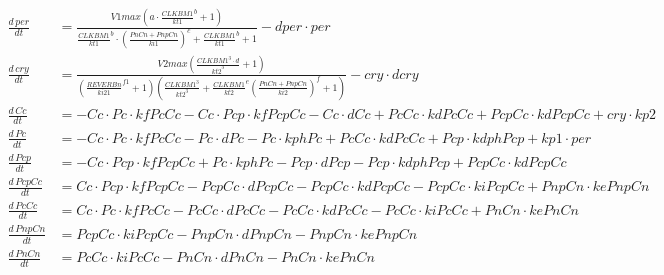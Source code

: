 \begin{model}[p]
\begin{align*}
  \frac{d\,\mathit{per}}{dt} &= \frac{\mathit{V1max} \left(\mathit{a} \cdot {\frac{\mathit{CLKBM1}}{\mathit{kt1}}}^{\mathit{b}} + 1\right)}{{\frac{\mathit{CLKBM1}}{\mathit{kt1}}}^{\mathit{b}} \cdot {(\frac{\mathit{PnCn} + \mathit{PnpCn}}{\mathit{ki1}})}^{\mathit{c}} + {\frac{\mathit{CLKBM1}}{\mathit{kt1}}}^{\mathit{b}} + 1} - \mathit{dper} \cdot \mathit{per}\\
  \frac{d\,\mathit{cry}}{dt} &= \frac{\mathit{V2max}
  \left(\frac{\mathit{CLKBM1}^{3} \cdot \mathit{d}}{\mathit{kt2}^{3}} +
1\right)}{\left({\frac{\mathit{REVERBn}}{\mathit{ki21}}}^{\mathit{f1}} +
1\right) \left(\frac{\mathit{CLKBM1}^{3}}{\mathit{kt2}^{3}} +
{\frac{\mathit{CLKBM1}}{\mathit{kt2}}}^{\mathit{e}}
{\left(\frac{\mathit{PnCn} +
\mathit{PnpCn}}{\mathit{ki2}}\right)}^{\mathit{f}} + 1\right)} - \mathit{cry}
\cdot \mathit{dcry}\\
\frac{d\,\mathit{Cc}}{dt} &= - \mathit{Cc} \cdot \mathit{Pc} \cdot \mathit{kfPcCc} - \mathit{Cc} \cdot \mathit{Pcp} \cdot \mathit{kfPcpCc} - \mathit{Cc} \cdot \mathit{dCc} + \mathit{PcCc} \cdot \mathit{kdPcCc} + \mathit{PcpCc} \cdot \mathit{kdPcpCc} + \mathit{cry} \cdot \mathit{kp2}\\
\frac{d\,\mathit{Pc}}{dt} &= - \mathit{Cc} \cdot \mathit{Pc} \cdot \mathit{kfPcCc} - \mathit{Pc} \cdot \mathit{dPc} - \mathit{Pc} \cdot \mathit{kphPc} + \mathit{PcCc} \cdot \mathit{kdPcCc} + \mathit{Pcp} \cdot \mathit{kdphPcp} + \mathit{kp1} \cdot \mathit{per}\\
\frac{d\,\mathit{Pcp}}{dt} &= - \mathit{Cc} \cdot \mathit{Pcp} \cdot \mathit{kfPcpCc} + \mathit{Pc} \cdot \mathit{kphPc} - \mathit{Pcp} \cdot \mathit{dPcp} - \mathit{Pcp} \cdot \mathit{kdphPcp} + \mathit{PcpCc} \cdot \mathit{kdPcpCc}\\
\frac{d\,\mathit{PcpCc}}{dt} &= \mathit{Cc} \cdot \mathit{Pcp} \cdot \mathit{kfPcpCc} - \mathit{PcpCc} \cdot \mathit{dPcpCc} - \mathit{PcpCc} \cdot \mathit{kdPcpCc} - \mathit{PcpCc} \cdot \mathit{kiPcpCc} + \mathit{PnpCn} \cdot \mathit{kePnpCn}\\
\frac{d\,\mathit{PcCc}}{dt} &= \mathit{Cc} \cdot \mathit{Pc} \cdot \mathit{kfPcCc} - \mathit{PcCc} \cdot \mathit{dPcCc} - \mathit{PcCc} \cdot \mathit{kdPcCc} - \mathit{PcCc} \cdot \mathit{kiPcCc} + \mathit{PnCn} \cdot \mathit{kePnCn}\\
\frac{d\,\mathit{PnpCn}}{dt} &= \mathit{PcpCc} \cdot \mathit{kiPcpCc} - \mathit{PnpCn} \cdot \mathit{dPnpCn} - \mathit{PnpCn} \cdot \mathit{kePnpCn}\\
\frac{d\,\mathit{PnCn}}{dt} &= \mathit{PcCc} \cdot \mathit{kiPcCc} - \mathit{PnCn} \cdot \mathit{dPnCn} - \mathit{PnCn} \cdot \mathit{kePnCn}\\
\end{align*}
\end{model}

